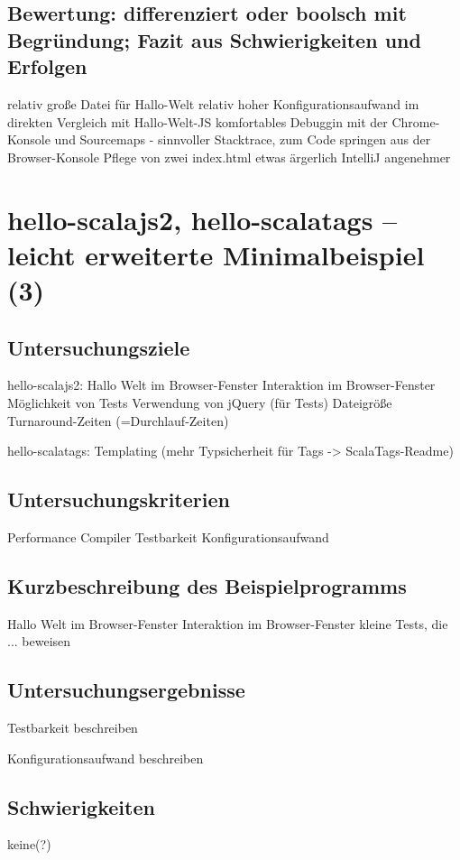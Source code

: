 \documentclass[a4paper, 12pt, hidelinks, listof=totoc, listoftables=totoc, bibliography=totoc]{scrreprt}
\begin{document}
\subsection{Bewertung: differenziert oder boolsch mit Begründung; Fazit aus Schwierigkeiten und Erfolgen}
relativ große Datei für Hallo-Welt
relativ hoher Konfigurationsaufwand im direkten Vergleich mit Hallo-Welt-JS
komfortables Debuggin mit der Chrome-Konsole und Sourcemaps - sinnvoller Stacktrace, zum Code springen aus der Browser-Konsole
Pflege von zwei index.html etwas ärgerlich
IntelliJ angenehmer



\section{hello-scalajs2, hello-scalatags -- leicht erweiterte Minimalbeispiel (3)}

\subsection{Untersuchungsziele}

hello-scalajs2:
Hallo Welt im Browser-Fenster
Interaktion im Browser-Fenster
Möglichkeit von Tests
Verwendung von jQuery (für Tests)
Dateigröße
Turnaround-Zeiten (=Durchlauf-Zeiten)

hello-scalatags:
Templating (mehr Typsicherheit für Tags -> ScalaTags-Readme)
\subsection{Untersuchungskriterien}
Performance
	Compiler
Testbarkeit
Konfigurationsaufwand
\subsection{Kurzbeschreibung des Beispielprogramms}
Hallo Welt im Browser-Fenster
Interaktion im Browser-Fenster
kleine Tests, die ... beweisen


\subsection{Untersuchungsergebnisse}

Testbarkeit
beschreiben

Konfigurationsaufwand
beschreiben

\subsection{Schwierigkeiten}
keine(?)
\end{document}
